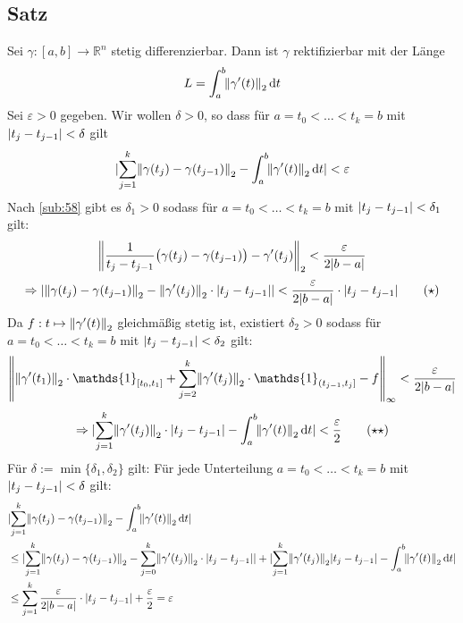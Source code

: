 \subsection[Satz über Rektifizierbarkeit]{Satz} %
\label{sub:59}
Sei $\gamma : [a,b] \to \mathds{R}^n$ stetig differenzierbar. Dann ist $\gamma$ rektifizierbar mit der Länge 
\[
	L = \int_{a} ^{b} \! \norm[2]{\gamma'(t)}  \, \mathrm{d}t 
\]
Sei $\varepsilon >0$ gegeben. Wir wollen $\delta >0$, so dass für $a= t_0< \ldots < t_k =b$ mit $\lvert t_j - t_{j-1}\rvert< \delta  $ gilt
\[
	\abs{ \sum_{j=1}^{k}  \norm[2]{\gamma (t_j) - \gamma (t_{j-1})}  - \int_{a} ^{b} \! \norm[2]{\gamma'(t)}  \, \mathrm{d}t } < \varepsilon
\]
Nach \ref{sub:58} gibt es $\delta_1 >0$ sodass für $a= t_0< \ldots < t_k =b$ mit  $\lvert t_j - t_{j-1}\rvert< \delta_1$ gilt:
\[
	\norm[2]{\frac{1}{t_j - t_{j-1}} \big( \gamma(t_j) - \gamma(t_{j-1}) \big) - \gamma'(t_j)  } < \frac{\varepsilon}{2 \abs{b-a} }  
\]
\[
	\Rightarrow \abs{\norm[2]{ \gamma(t_j) - \gamma(t_{j-1}) } - \norm[2]{\gamma'(t_j)}  \cdot  \abs{ t_j - t_{j-1}}}  < \frac{\varepsilon}{2 \abs{b-a} } \cdot 
	\abs{t_j - t_{j-1}} \tag{$\star$}
\]   
Da $f : t \mapsto \norm[2]{\gamma'(t)} $ gleichmäßig stetig ist, existiert $\delta_2 >0$ sodass für $a= t_0< \ldots < t_k =b$ mit  $\lvert t_j - t_{j-1}\rvert< \delta_2$ gilt:
\[
	\norm[\infty]{ \norm[2]{\gamma'(t_1)} \cdot \mathds{1}_{[t_0, t_1]}  + \sum_{j=2}^{k}  \norm[2]{\gamma'(t_j)} \cdot \mathds{1}_{(t_{j-1},t_j]}  - f
	}  < \frac{\varepsilon}{2 \abs{b-a} } 
\]
\[
	\Rightarrow  \abs{\sum_{j=1}^{k}  \norm[2]{\gamma'(t_j)} \cdot \abs{t_j - t_{j-1}} - \int_{a} ^{b} \! \norm[2]{\gamma'(t)}  \, \mathrm{d}t   } < \frac{\varepsilon}{2}
	\tag{$\star \star$} 
\]
Für $\delta := \min \{\delta_1, \delta_2\}$ gilt: Für jede Unterteilung $a= t_0< \ldots < t_k =b$ mit  $\lvert t_j - t_{j-1}\rvert< \delta$ gilt:
\begin{align*}
	& \abs{ \sum_{j=1}^{k}  \norm[2]{\gamma(t_j) - \gamma(t_{j-1})} - \int_{a} ^{b} \! \norm[2]{\gamma'(t)}  \, \mathrm{d}t  }   \\
	&\le \abs{\sum_{j=1}^{k} \norm[2]{\gamma(t_j) - \gamma(t_{j-1})}  - \sum_{j=0}^{k} \norm[2]{\gamma'(t_j)} \cdot  \abs{t_j - t_{j-1}}    } 
	+ \abs{\sum_{j=1}^{k}  \norm[2]{\gamma'(t_j)} \abs{t_j - t_{j-1}} - \int_{a} ^{b} \! \norm[2]{\gamma'(t)}  \, \mathrm{d}t   } \\
	&\le \sum_{j=1}^{k}  \frac{\varepsilon}{2 \abs{b-a} } \cdot  \abs{t_j - t_{j-1}} + \frac{\varepsilon}{2} = \varepsilon     
\end{align*}

